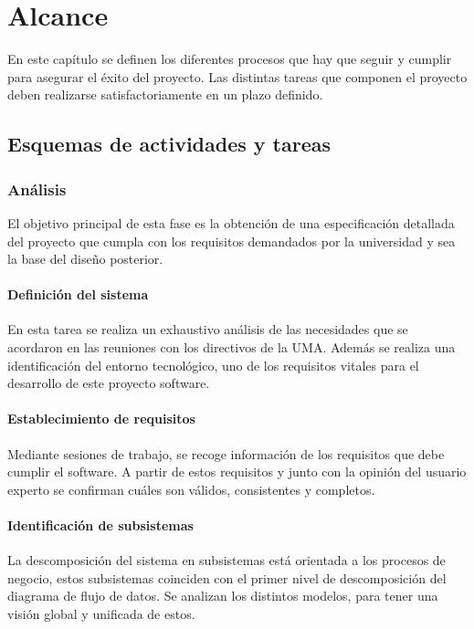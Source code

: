 \documentclass[11pt,a4paper,spanish,twoside]{book}
\begin{document}
\tableofcontents

\chapter{Alcance}
En este capítulo se definen los diferentes procesos que hay que seguir y
cumplir para asegurar el éxito del proyecto. Las distintas tareas que
componen el proyecto deben realizarse satisfactoriamente en un plazo
definido.

\section{Esquemas de actividades y tareas}

\subsection{Análisis}
El objetivo principal de esta fase es la obtención de una especificación
detallada del proyecto que cumpla con los requisitos demandados por la 
universidad y sea la base del diseño posterior.

\subsubsection{Definición del sistema}
En esta tarea se realiza un exhaustivo análisis de las necesidades que se
acordaron en las reuniones con los directivos de la UMA. Además se realiza una
identificación del entorno tecnológico, uno de los requisitos vitales para el
desarrollo de este proyecto software.

\subsubsection{Establecimiento de requisitos}
Mediante sesiones de trabajo, se recoge información de los requisitos que debe
cumplir el software. A partir de estos requisitos y junto con la opinión del 
usuario experto se confirman cuáles son válidos, consistentes y completos.

\subsubsection{Identificación de subsistemas}
La descomposición del sistema en subsistemas está orientada a los procesos de
negocio, estos subsistemas coinciden con el primer nivel de descomposición
del diagrama de flujo de datos. Se analizan los distintos modelos, para tener
una visión global y unificada de estos.
\end{document}
